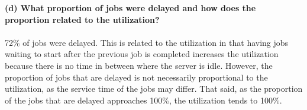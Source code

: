 \textbf{(d) What proportion of jobs were delayed and how does the proportion related to the utilization?\\\\}
72\% of jobs were delayed. This is related to the utilization in that having jobs waiting to start after the previous job is completed increases the utilization because there is no time in between where the server is idle. However, the proportion of jobs that are delayed is not necessarily proportional to the utilization, as the service time of the jobs may differ. That said, as the proportion of the jobs that are delayed approaches 100\%, the utilization tends to 100\%.
